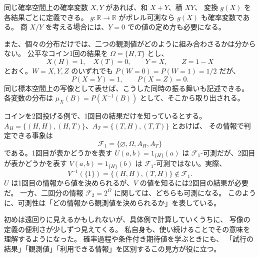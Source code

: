 \documentclass[a4paper,10pt,pdflatex,ja=standard,jafont=ipaex-type1,
  magstyle=real,scale=1]{bxjsarticle}
\newcommand{\F}{\mathcal F}
\newcommand{\R}{\mathbb R}
\begin{document}
同じ確率空間上の確率変数 $X,Y$ があれば、和 $X+Y$、積 $XY$、
変換 $g(X)$ を各結果ごとに定義できる。
$g:\R\to\R$ がボレル可測なら $g(X)$ も確率変数である。
商 $X/Y$ を考える場合には、$Y=0$ での値の定め方も必要になる。

また、個々の分布だけでは、二つの観測値がどのように組み合わさるかは分からない。
公平なコイン1回の結果を $\Omega=\{H,T\}$ とし、
$$
  X(H)=1,\quad X(T)=0,\qquad Y=X,\qquad Z=1-X
$$
とおく。$W=X,Y,Z$ のいずれでも $P(W=0)=P(W=1)=1/2$ だが、
$$
  P(X=Y)=1,\qquad P(X=Z)=0.
$$
同じ標本空間上の写像として表せば、こうした同時の振る舞いも記述できる。
各変数の分布は $\mu_X(B)=P(X^{-1}(B))$ として、そこから取り出される。

コインを2回投げる例で、1回目の結果だけを知っているとする。
$A_H=\{(H,H),(H,T)\}$、$A_T=\{(T,H),(T,T)\}$ とおけば、
その情報で判定できる事象は
$$
  \F_1=\{\varnothing,\Omega,A_H,A_T\}
$$
である。1回目が表かどうかを表す $U(a,b)=\mathrm{1}_{\{H\}}(a)$ は
$\F_1$-可測だが、2回目が表かどうかを表す
$V(a,b)=\mathrm{1}_{\{H\}}(b)$ は $\F_1$-可測ではない。実際、
$$
  V^{-1}(\{1\})=\{(H,H),(T,H)\}\notin\F_1.
$$
$U$ は1回目の情報から値を決められるが、$V$ の値を知るには2回目の結果が必要だ。
一方、二回分の情報 $\F_2=2^\Omega$ に関しては、どちらも可測になる。
このように、可測性は「どの情報から観測値を決められるか」を表している。

初めは遠回りに見えるかもしれないが、具体例で計算していくうちに、
写像の定義の便利さが少しずつ見えてくる。
私自身も、使い続けることでその意味を理解するようになった。
確率過程や条件付き期待値を学ぶときにも、
「試行の結果」「観測値」「利用できる情報」を区別するこの見方が役に立つ。
\label{lastpage}
\clearpage
\endgroup
\end{document}
